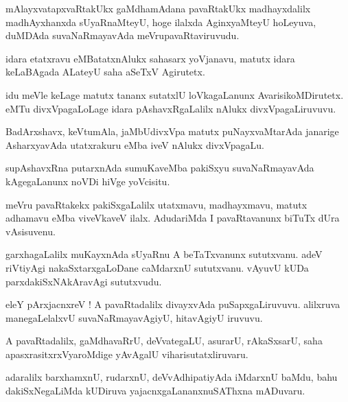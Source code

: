\documentclass{article}
\begin{document}
\begin{mn}
mAlayxvatapxvaRtakUkx gaMdhamAdana pavaRtakUkx madhayxdalilx madhAyxhanxda 
sUyaRnaMteyU, hoge ilalxda AginxyaMteyU hoLeyuva, 
duMDAda suvaNaRmayavAda meVrupavaRtaviruvudu.
\end{mn}

\begin{mn}
idara etatxravu eMBatatxnAlukx sahasarx yoVjanavu, matutx idara keLaBAgada 
ALateyU saha aSeTxV Agirutetx.
\end{mn}

\begin{mn}
idu meVle keLage matutx tananx sutatxlU loVkagaLanunx AvarisikoMDirutetx.
eMTu divxVpagaLoLage idara pAshavxRgaLalilx nAlukx divxVpagaLiruvuvu.
\end{mn}

\begin{mn}
BadArxshavx, keVtumAla, jaMbUdivxVpa matutx puNayxvaMtarAda 
janarige AsharxyavAda utatxrakuru eMba iveV nAlukx divxVpagaLu.
\end{mn}

\begin{mn}
supAshavxRna putarxnAda sumuKaveMba pakiSxyu suvaNaRmayavAda kAgegaLanunx noVDi hiVge yoVcisitu.
\end{mn}

\begin{mn}
meVru pavaRtakekx pakiSxgaLalilx utatxmavu, madhayxmavu, matutx adhamavu eMba viveVkaveV ilalx.
AdudariMda I pavaRtavanunx biTuTx dUra vAsisuvenu.
\end{mn}

\begin{mn}
garxhagaLalilx muKayxnAda sUyaRnu A beTaTxvanunx sututxvanu. 
adeV riVtiyAgi nakaSxtarxgaLoDane caMdarxnU sututxvanu. 
vAyuvU kUDa parxdakiSxNAkAravAgi sututxvudu.
\end{mn}

\begin{mn}
eleY pArxjacnxreV ! A pavaRtadalilx divayxvAda puSapxgaLiruvuvu. 
alilxruva manegaLelalxvU suvaNaRmayavAgiyU, hitavAgiyU iruvuvu.
\end{mn}

\begin{mn}
A pavaRtadalilx, gaMdhavaRrU, deVvategaLU, asurarU, rAkaSxsarU,
saha apasxrasitxrxVyaroMdige yAvAgalU viharisutatxliruvaru.
\end{mn}

\begin{mn}
adaralilx barxhamxnU, rudarxnU, deVvAdhipatiyAda iMdarxnU baMdu,
 bahu dakiSxNegaLiMda kUDiruva yajacnxgaLananxnuSAThxna mADuvaru.
\end{mn}
\end{document}
